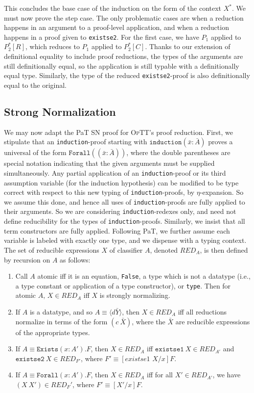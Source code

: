 \documentclass{fundam}
\newcommand{\optt}{\textsc{OpTT}}
\begin{document}
This concludes the base case of the induction on the form of the
context $X^*$.  We must now prove the step case.  The only problematic
cases are when a reduction happens in an argument to a proof-level
application, and when a reduction happens in a proof given to
\texttt{existse2}.  For the first case, we have $P_1$ applied to
$P_2^*[R]$, which reduces to $P_1$ applied to $P_2^*[C]$.  Thanks to
our extension of definitional equality to include proof reductions,
the types of the arguments are still definitionally equal, so the
application is still typable with a definitionally equal type.
Similarly, the type of the reduced \texttt{existse2}-proof
is also definitionally equal to the original.

\subsection{Strong Normalization}

We may now adapt the PaT SN proof for \optt's proof reduction.  First,
we stipulate that an \texttt{induction}-proof starting with
$\texttt{induction}(\bar{x}:\bar{A})$ proves a universal of the form
$\texttt{Forall}((\bar{x}:\bar{A}))$, where the double parentheses are
special notation indicating that the given arguments must be supplied
simultaneously.  Any partial application of an
\texttt{induction}-proof or its third assumption variable (for the
induction hypothesis) can be modified to be type correct with respect
to this new typing of \texttt{induction}-proofs, by $\eta$-expansion.
So we assume this done, and hence all uses of
\texttt{induction}-proofs are fully applied to their arguments.  So we
are considering \texttt{induction}-redexes only, and need not define
reducibility for the types of \texttt{induction}-proofs.  Similarly,
we insist that all term constructors are fully applied.  Following
PaT, we further assume each variable is labeled with exactly one type,
and we dispense with a typing context.  The set of reducible
expressions $X$ of classifier $A$, denoted $\textit{RED}_A$, is then
defined by recursion on $A$ as follows:

\begin{enumerate}
\item Call $A$ atomic iff it is an equation, \texttt{False}, a type
which is not a datatype (i.e., a type constant or application of a
type constructor), or \texttt{type}. Then for atomic $A$,
$X\in\textit{RED}_A$ iff $X$ is strongly normalizing.
\item If $A$ is a datatype, and so $A \equiv \langle d
\bar{Y}\rangle$, then $X\in\textit{RED}_A$ iff all reductions normalize in terms
of the form $(c\ \bar{X})$, where the $\bar{X}$ are reducible
expressions of the appropriate types.  
\item If $A \equiv \texttt{Exists}(x : A'). F$, then $X\in\textit{RED}_A$ iff $\texttt{existse1}\ X\in\textit{RED}_{A'}$
and $\texttt{existse2}\ X\in\textit{RED}_{F'}$, where $F' \equiv {[\textit{existse1\ X}/x]F}$.
\item If $A \equiv \texttt{Forall}(x : A').F$, then
$X\in\textit{RED}_A$ iff for all $X'\in\textit{RED}_{A'}$, we have $(X\
X')\in\textit{RED}_F'$, where $F' \equiv [X'/x]F$.
\end{enumerate}
\end{document}

